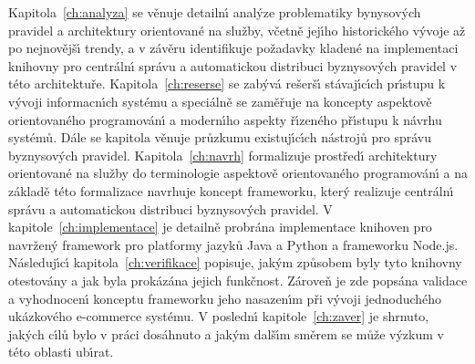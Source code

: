 Kapitola~\ref{ch:analyza} se věnuje detailn\'{\i} anal\'yze problematiky bynysov\'ych pravidel a
architektury orientované na služby, včetně jej\'{\i}ho historického v\'yvoje až po nejnovějš\'{\i} trendy,
a v závěru identifikuje požadavky kladené na implementaci knihovny pro centráln\'{\i} správu a
automatickou distribuci byznysov\'ych pravidel v této architektuře. Kapitola~\ref{ch:reserse}
se zab\'yvá rešerš\'{\i} stávaj\'{\i}c\'{\i}ch pr\'{\i}stupu k v\'yvoji informacn\'{\i}ch systému a speciálně se zaměřuje
na koncepty aspektově orientovaného programován\'{\i} a modern\'{\i}ho aspekty ř\'{\i}zeného př\'{\i}stupu k návrhu
systémů. Dále se kapitola věnuje průzkumu existuj\'{\i}c\'{\i}ch nástrojů pro správu byznysov\'ych pravidel.
Kapitola~\ref{ch:navrh} formalizuje prostřed\'{\i} architektury orientované na služby do terminologie
aspektově orientovaného programován\'{\i} a na základě této formalizace navrhuje koncept frameworku,
kter\'y realizuje centráln\'{\i} správu a automatickou distribuci byznysov\'ych pravidel.
V kapitole~\ref{ch:implementace} je detailně probrána implementace knihoven pro navržen\'y framework
pro platformy jazyků Java a Python a frameworku Node.js. Následuj\'{\i}c\'{\i} kapitola~\ref{ch:verifikace}
popisuje, jak\'ym způsobem byly tyto knihovny otestovány a jak byla prokázána jejich funkčnost. Zároveň
je zde popsána validace a vyhodnocen\'{\i} konceptu frameworku jeho nasazen\'{\i}m při v\'yvoji
jednoduchého ukázkového e-commerce systému. V posledn\'{\i} kapitole~\ref{ch:zaver} je shrnuto, jak\'ych
c\'{\i}lů bylo v práci dosáhnuto a jak\'ym dalš\'{\i}m směrem se může v\'yzkum v této oblasti ub\'{\i}rat.

